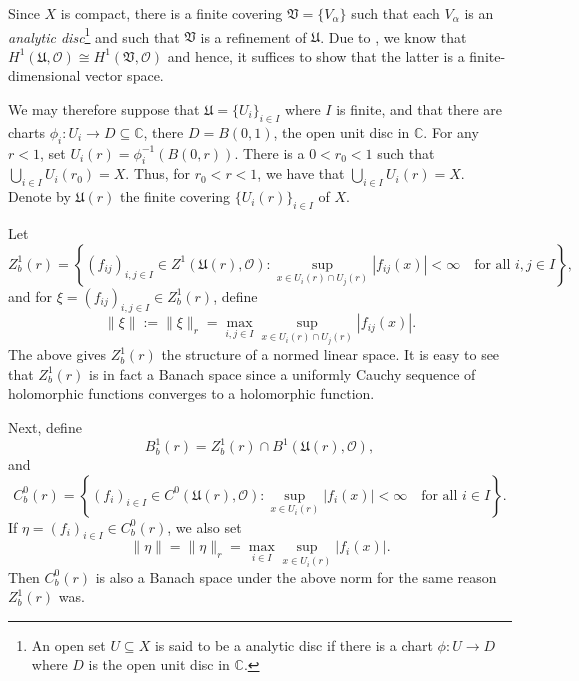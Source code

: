 \documentclass[10pt]{article}
\theoremstyle{thmstyle}
\theoremstyle{defstyle}
\newcommand{\bbC}{\mathbb{C}}
\newcommand{\frakU}{\mathfrak{U}}
\newcommand{\frakV}{\mathfrak{V}}
\newcommand{\scrO}{\mathscr{O}} %
\begin{document}
Since $X$ is compact, there is a finite covering $\frakV = \{V_\alpha\}$ such that each $V_\alpha$ is an \emph{analytic disc}\footnote{An open set $U\subseteq X$ is said to be a analytic disc if there is a chart $\phi: U\to D$ where $D$ is the open unit disc in $\bbC$.} and such that $\frakV$ is a refinement of $\frakU$. Due to , we know that $H^1(\frakU,\scrO)\cong H^1(\frakV,\scrO)$ and hence, it suffices to show that the latter is a finite-dimensional vector space.

We may therefore suppose that $\frakU = \{U_i\}_{i\in I}$ where $I$ is finite, and that there are charts $\phi_i: U_i\to D\subseteq\bbC$, there $D = B(0, 1)$, the open unit disc in $\bbC$. For any $r < 1$, set $U_i(r) = \phi_i^{-1}\left(B(0, r)\right)$. There is a $0 < r_0 < 1$ such that $\bigcup_{i\in I} U_i(r_0) = X$. Thus, for $r_0 < r < 1$, we have that $\bigcup_{i\in I} U_i(r) = X$. Denote by $\frakU(r)$ the finite covering $\{U_i(r)\}_{i\in I}$ of $X$.

Let 
\begin{equation*}
    Z_b^1(r) = \left\{(f_{ij})_{i,j\in I}\in Z^1(\frakU(r),\scrO)\colon \sup_{x\in U_i(r)\cap U_j(r)}|f_{ij}(x)| < \infty\quad\text{for all }i,j\in I\right\},
\end{equation*}
and for $\xi = (f_{ij})_{i,j\in I}\in Z^1_b(r)$, define 
\begin{equation*}
    \|\xi\| := \|\xi\|_r = \max_{i,j\in I}\sup_{x\in U_i(r)\cap U_j(r)}|f_{ij}(x)|.
\end{equation*}
The above gives $Z^1_b(r)$ the structure of a normed linear space. It is easy to see that $Z^1_b(r)$ is in fact a Banach space since a uniformly Cauchy sequence of holomorphic functions converges to a holomorphic function.

Next, define 
\begin{equation*}
    B^1_b(r) = Z^1_b(r)\cap B^1(\frakU(r), \scrO),
\end{equation*}
and 
\begin{equation*}
    C^0_b(r) = \left\{(f_i)_{i\in I}\in C^0(\frakU(r),\scrO)\colon \sup_{x\in U_i(r)}|f_i(x)| < \infty\quad\text{for all }i\in I\right\}.
\end{equation*}
If $\eta = (f_i)_{i\in I}\in C^0_b(r)$, we also set 
\begin{equation*}
    \|\eta\| = \|\eta\|_r = \max_{i\in I}\sup_{x\in U_i(r)}|f_i(x)|.
\end{equation*}
Then $C_b^0(r)$ is also a Banach space under the above norm for the same reason $Z^1_b(r)$ was.
\end{document}
